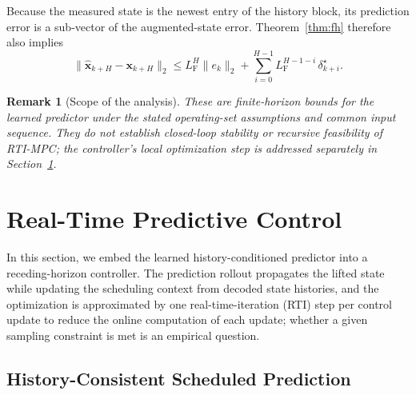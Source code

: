 \documentclass[journal]{IEEEtran}
\newtheorem{remark}{Remark}
\newcommand{\vx}{\mathbf{x}}
\newcommand{\mLf}{L_{\mathrm{F}}}
\begin{document}
Because the measured state is the newest entry of the history block, its prediction error is a sub-vector of the augmented-state error. Theorem~\ref{thm:fh} therefore also implies
\begin{equation}
    \|\hat{\vx}_{k+H}-\vx_{k+H}\|_2
    \le \mLf^{H}\|e_k\|_2+\sum_{i=0}^{H-1}\mLf^{H-1-i}\,\delta^{\star}_{k+i}.
    \label{eq:cor_physical}
\end{equation}

\begin{remark}[Scope of the analysis]
\label{subsec:scope}
These are finite-horizon bounds for the learned predictor under the stated operating-set assumptions and common input sequence. They do not establish closed-loop stability or recursive feasibility of RTI-MPC; the controller's local optimization step is addressed separately in Section~\ref{sec:control}.
\end{remark}

\section{Real-Time Predictive Control}
\label{sec:control}

In this section, we embed the learned history-conditioned predictor into a receding-horizon controller. The prediction rollout propagates the lifted state while updating the scheduling context from decoded state histories, and the optimization is approximated by one real-time-iteration (RTI) step per control update \cite{diehl2005realtime, gros2020rti} to reduce the online computation of each update; whether a given sampling constraint is met is an empirical question.

\subsection{History-Consistent Scheduled Prediction}
\end{document}
